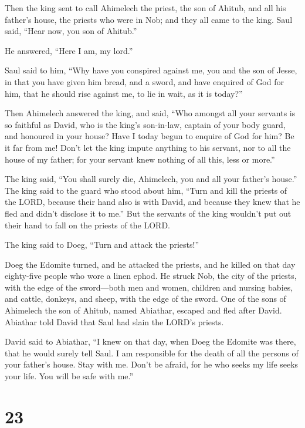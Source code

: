  Then the king sent to call Ahimelech the priest, the son
of Ahitub, and all his father's house, the priests who were in Nob; and
they all came to the king.  Saul said, ``Hear now, you son
of Ahitub.''

He answered, ``Here I am, my lord.''

 Saul said to him, ``Why have you conspired against me, you
and the son of Jesse, in that you have given him bread, and a sword, and
have enquired of God for him, that he should rise against me, to lie in
wait, as it is today?''

 Then Ahimelech answered the king, and said, ``Who amongst
all your servants is so faithful as David, who is the king's son-in-law,
captain of your body guard, and honoured in your house? 
Have I today begun to enquire of God for him? Be it far from me! Don't
let the king impute anything to his servant, nor to all the house of my
father; for your servant knew nothing of all this, less or more.''

 The king said, ``You shall surely die, Ahimelech, you and
all your father's house.''  The king said to the guard who
stood about him, ``Turn and kill the priests of the LORD, because their
hand also is with David, and because they knew that he fled and didn't
disclose it to me.'' But the servants of the king wouldn't put out their
hand to fall on the priests of the LORD.

 The king said to Doeg, ``Turn and attack the priests!''

Doeg the Edomite turned, and he attacked the priests, and he killed on
that day eighty-five people who wore a linen ephod.  He
struck Nob, the city of the priests, with the edge of the sword---both
men and women, children and nursing babies, and cattle, donkeys, and
sheep, with the edge of the sword.  One of the sons of
Ahimelech the son of Ahitub, named Abiathar, escaped and fled after
David.  Abiathar told David that Saul had slain the LORD's
priests.

 David said to Abiathar, ``I knew on that day, when Doeg
the Edomite was there, that he would surely tell Saul. I am responsible
for the death of all the persons of your father's house. 
Stay with me. Don't be afraid, for he who seeks my life seeks your life.
You will be safe with me.''

\hypertarget{section-22}{%
\section{23}\label{section-22}}

